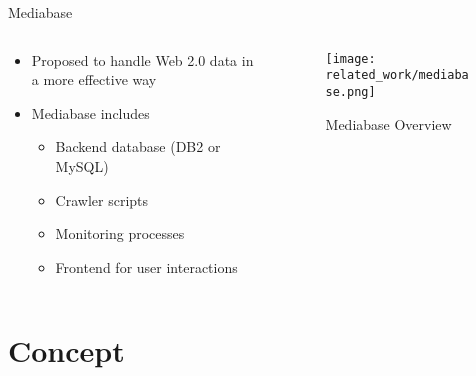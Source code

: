 \begin{frame}{Mediabase}
  \begin{columns}

    \begin{column}[]{0.4\textwidth}
      \begin{itemize}
        \item Proposed to handle Web 2.0 data in a more effective way
        \item Mediabase includes
              \begin{itemize}
                \item Backend database (DB2 or MySQL)
                \item Crawler scripts
                \item Monitoring processes
                \item Frontend for user interactions
              \end{itemize}
      \end{itemize}
    \end{column}

    \begin{column}[]{0.6\textwidth}
      \begin{figure}[h]
        \centering
        \texttt{[image: related\_work/mediabase.png]}
        \caption{Mediabase Overview \cite{Klam10e}}
      \end{figure}
    \end{column}

  \end{columns}
\end{frame}



\section{Concept}
